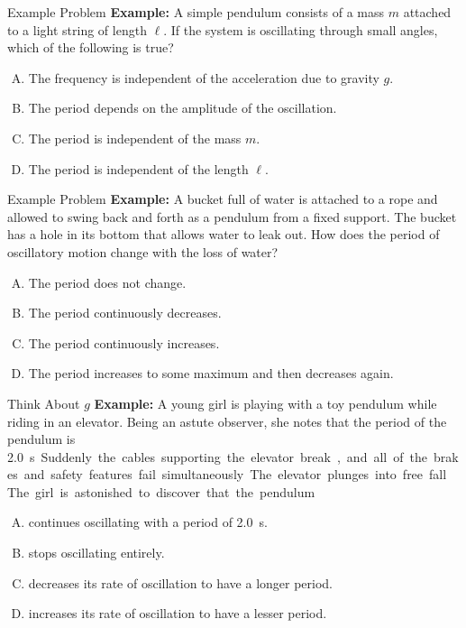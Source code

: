 \documentclass[12pt,compress,aspectratio=169]{beamer}
\begin{document}
\begin{frame}{Example Problem}
  \textbf{Example:} A simple pendulum consists of a mass $m$ attached to a
  light string of length $\ell$. If the system is oscillating through small
  angles, which of the following is true?
  \begin{enumerate}[(A)]
  \item The frequency is independent of the acceleration due to gravity $g$.
  \item The period depends on the amplitude of the oscillation.
  \item The period is independent of the mass $m$.
  \item The period is independent of the length $\ell$.
  \end{enumerate}
\end{frame}



\begin{frame}{Example Problem}
  \textbf{Example:} A bucket full of water is attached to a rope and allowed
  to swing back and forth as a pendulum from a fixed support. The bucket has a
  hole in its bottom that allows water to leak out. How does the period of
  oscillatory motion change with the loss of water?
  \begin{enumerate}[(A)]
  \item The period does not change.
  \item The period continuously decreases.
  \item The period continuously increases.
  \item The period increases to some maximum and then decreases again.
  \end{enumerate}
\end{frame}



\begin{frame}{Think About $g$}
  \textbf{Example:} A young girl is playing with a toy pendulum while riding
  in an elevator. Being an astute observer, she notes that the period of the
  pendulum is \SI{2.0}\second. Suddenly the cables supporting the elevator
  break, and all of the brakes and safety features fail simultaneously. The
  elevator plunges into free fall. The girl is astonished to discover that the
  pendulum \underline{\hspace{1in}}
  \begin{enumerate}[(A)]
  \item continues oscillating with a period of \SI{2.0}\second.
  \item stops oscillating entirely.
  \item decreases its rate of oscillation to have a longer period.
  \item increases its rate of oscillation to have a lesser period.
  \end{enumerate}
\end{frame}
\end{document}
